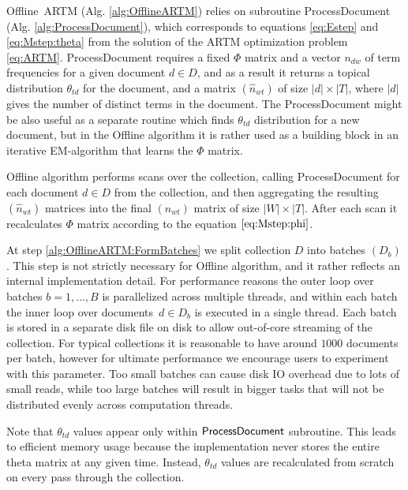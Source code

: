 \documentclass[russian,english]{llncs}
\newcommand{\kw}[1]{\mbox{\textsf{#1}}}
\begin{document}
\kw{Offline ARTM} (Alg. \ref{alg:OfflineARTM}) relies on subroutine
\kw{ProcessDocument} (Alg. \ref{alg:ProcessDocument}),
which corresponds to equations \eqref{eq:Estep} and \eqref{eq:Mstep:theta}
from the solution of the ARTM optimization problem \eqref{eq:ARTM}.
\kw{ProcessDocument} requires a fixed $\Phi$ matrix
and a vector $n_{dw}$ of term frequencies for a given document $d \in D$,
and as a result it returns a topical distribution $\theta_{td}$ for the document,
and a matrix $(\hat n_{wt})$ of size $|d| \times |T|$,
where $|d|$ gives the number of distinct terms in the document.
The \kw{ProcessDocument} might be also useful as a separate routine which finds $\theta_{td}$ distribution for a new document,
but in the \kw{Offline} algorithm it is rather used as a building block in an iterative EM-algorithm that learns the $\Phi$ matrix.

\kw{Offline} algorithm performs scans over the collection, calling \kw{ProcessDocument}
for each document $d \in D$ from the collection,
and then aggregating the resulting $(\hat n_{wt})$ matrices into the final $(n_{wt})$ matrix of size $|W| \times |T|$.
After each scan it recalculates $\Phi$ matrix according to the equation $\eqref{eq:Mstep:phi}$.


At step \ref{alg:OfflineARTM:FormBatches} we split collection $D$ into batches $(D_b)$.
This step is not strictly necessary for \kw{Offline} algorithm,
and it rather reflects an internal implementation detail.
For performance reasons the outer loop over batches $b = 1, \dots, B$ is parallelized across multiple threads,
and within each batch the inner loop over documents~$d \in D_b$
is executed in a single thread.
Each batch is stored in a separate disk file on disk to allow out-of-core streaming of the collection.
For typical collections it is reasonable to have around $1000$ documents per batch,
however for ultimate performance we encourage users to experiment with this parameter.
Too small batches can cause disk IO overhead due to lots of small reads,
while too large batches will result in bigger tasks that will not be distributed evenly across computation threads.

Note that $\theta_{td}$ values appear only within $\kw{ProcessDocument}$ subroutine.
This leads to efficient memory usage because the implementation never stores the entire theta matrix at any given time.
Instead, $\theta_{td}$ values are recalculated from scratch on every pass through the collection.
\end{document}
